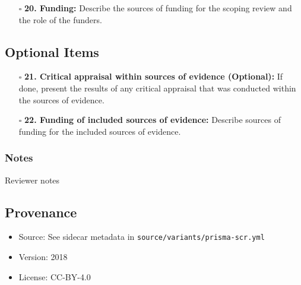 \documentclass[11pt]{article}
\def\tightlist{}
\begin{document}
\begin{Form}
\begin{itemize}
\tightlist
\item[$\square$]
  \textbf{20. Funding:} Describe the sources of funding for the scoping
  review and the role of the funders.
\end{itemize}

\subsection{Optional Items}\label{optional-items}

\begin{itemize}
\tightlist
\item[$\square$]
  \textbf{21. Critical appraisal within sources of evidence (Optional):}
  If done, present the results of any critical appraisal that was
  conducted within the sources of evidence.
\item[$\square$]
  \textbf{22. Funding of included sources of evidence:} Describe sources
  of funding for the included sources of evidence.
\end{itemize}

\subsubsection{Notes}\label{notes}

{Reviewer notes}

\subsection{Provenance}\label{provenance}

\begin{itemize}
\tightlist
\item
  Source: See sidecar metadata in
  \texttt{source/variants/prisma-scr.yml}
\item
  Version: 2018
\item
  License: CC-BY-4.0
\end{itemize}

\end{Form}
\end{document}
